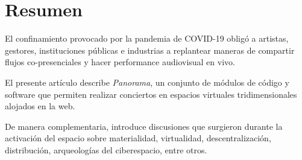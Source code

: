 \section*{Resumen}

El confinamiento provocado por la pandemia de COVID-19 obligó a artistas, gestores, instituciones públicas e industrias a replantear maneras de compartir flujos co-presenciales y hacer performance audiovisual en vivo.

El presente artículo describe \textit{Panorama}, un conjunto de módulos de código y software que permiten realizar conciertos en espacios virtuales tridimensionales alojados en la web.

De manera complementaria, introduce discusiones que surgieron durante la activación del espacio sobre materialidad, virtualidad, descentralización, distribución, arqueologías del ciberespacio, entre otros.                       
